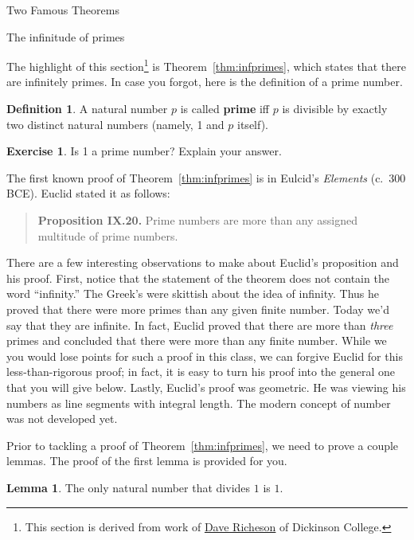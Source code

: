 \documentclass[11pt]{article}
\theoremstyle{definition}
\newtheorem{definition}[theorem]{Definition}
\newtheorem{exercise}[theorem]{Exercise}
\newtheorem{lemma}[theorem]{Lemma}
\begin{document}
\addtocounter{section}{3}

\begin{section}{Two Famous Theorems}

\begin{subsection}{The infinitude of primes}

The highlight of this section\footnote{This section is derived from work of \href{}{Dave Richeson} of Dickinson College.} is Theorem~\ref{thm:infprimes}, which states that there are infinitely primes. In case you forgot, here is the definition of a prime number.

\begin{definition}
A natural number $p$ is called \textbf{prime} iff $p$ is divisible by exactly two distinct natural numbers (namely, 1 and $p$ itself).
\end{definition}

\begin{exercise}
Is 1 a prime number?  Explain your answer.
\end{exercise}

The first known proof of Theorem~\ref{thm:infprimes} is in Eulcid's \emph{Elements} (c.\ 300 BCE). Euclid stated it as follows: 
\begin{quote}
\textbf{Proposition IX.20.} Prime numbers are more than any assigned multitude of prime numbers.
\end{quote}
There are a few interesting observations to make about Euclid's proposition and his proof. First, notice that the statement of the theorem does not contain the word ``infinity.'' The Greek's were skittish about the idea of infinity. Thus he proved that there were more primes than any given finite number. Today we'd say that they are infinite. In fact, Euclid proved that there are more than \emph{three} primes and concluded that there were more than any finite number. While we you would lose points for such a proof in this class, we can forgive Euclid for this less-than-rigorous proof;  in fact, it is easy to turn his proof into the general one that you will give below. Lastly, Euclid's proof was geometric. He was viewing his numbers as line segments with integral length. The modern concept of number was not developed yet.

Prior to tackling a proof of Theorem~\ref{thm:infprimes}, we need to prove a couple lemmas.  The proof of the first lemma is provided for you. 

\begin{lemma}\label{lem:divisorsof1}
The only natural number that divides $1$ is $1$.  
\end{lemma}


\end{subsection}
\end{section}
\end{document}
